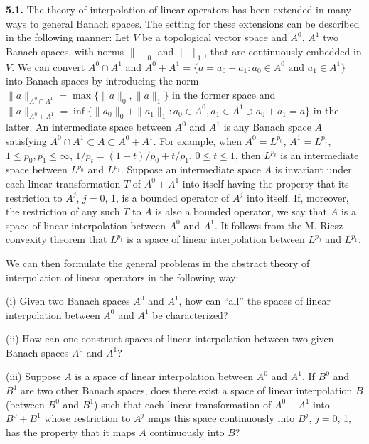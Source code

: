 \textbf{5.1.} The theory of interpolation of linear operators has been
extended in many ways to general Banach spaces. The setting for these
extensions can be described in the following manner: Let $V$ be a topological
vector space and $A^{0}$, $A^{1}$ two Banach spaces, with norms $\|\ \|_{0}$
and $\|\ \|_{1}$, that are continuously embedded in $V$. We can convert
$A^{0} \cap A^{1}$ and
$A^{0} + A^{1} = \{a = a_{0} + a_{1} : a_{0} \in A^{0} \text{ and } a_{1} \in A^{1}\}$
into Banach spaces by introducing the norm
$\|a\|_{A^{0} \cap A^{1}} = \max\{\|a\|_{0}, \|a\|_{1}\}$ in the former space
and
$\|a\|_{A^{0} + A^{1}} = \inf\{\|a_{0}\|_{0} + \|a_{1}\|_{1} : a_{0} \in A^{0}, a_{1} \in A^{1} \ni a_{0} + a_{1} = a\}$
in the latter. An intermediate space between $A^{0}$ and $A^{1}$ is any Banach
space $A$ satisfying $A^{0} \cap A^{1} \subset A \subset A^{0} + A^{1}$. For
example, when $A^{0} = L^{p_{0}}$, $A^{1} = L^{p_{1}}$,
$1 \leq p_{0}, p_{1} \leq \infty$,
$1/p_{t} = (1 - t)/p_{0} + t/p_{1}$, $0 \leq t \leq 1$, then $L^{p_{t}}$ is an
intermediate space between $L^{p_{0}}$ and $L^{p_{1}}$. Suppose an intermediate
space $A$ is invariant under each linear transformation $T$ of $A^{0} + A^{1}$
into itself having the property that its restriction to $A^{j}$, $j = 0$, 1, is
a bounded operator of $A^{j}$ into itself. If, moreover, the restriction of any
such $T$ to $A$ is also a bounded operator, we say that $A$ is a space of
linear interpolation between $A^{0}$ and $A^{1}$. It follows from the M. Riesz
convexity theorem that $L^{p_{t}}$ is a space of linear interpolation between
$L^{p_{0}}$ and $L^{p_{1}}$.

We can then formulate the general problems in the abstract theory of
interpolation of linear operators in the following way:

\textup{(i)} Given two Banach spaces $A^{0}$ and $A^{1}$, how can ``all'' the
spaces of linear interpolation between $A^{0}$ and $A^{1}$ be characterized?

\textup{(ii)} How can one construct spaces of linear interpolation between two
given Banach spaces $A^{0}$ and $A^{1}$?

\textup{(iii)} Suppose $A$ is a space of linear interpolation between $A^{0}$
and $A^{1}$. If $B^{0}$ and $B^{1}$ are two other Banach spaces, does there
exist a space of linear interpolation $B$ (between $B^{0}$ and $B^{1}$) such
that each linear transformation of $A^{0} + A^{1}$ into $B^{0} + B^{1}$ whose
restriction to $A^{j}$ maps this space continuously into $B^{j}$, $j = 0$, 1,
has the property that it maps $A$ continuously into $B$?

